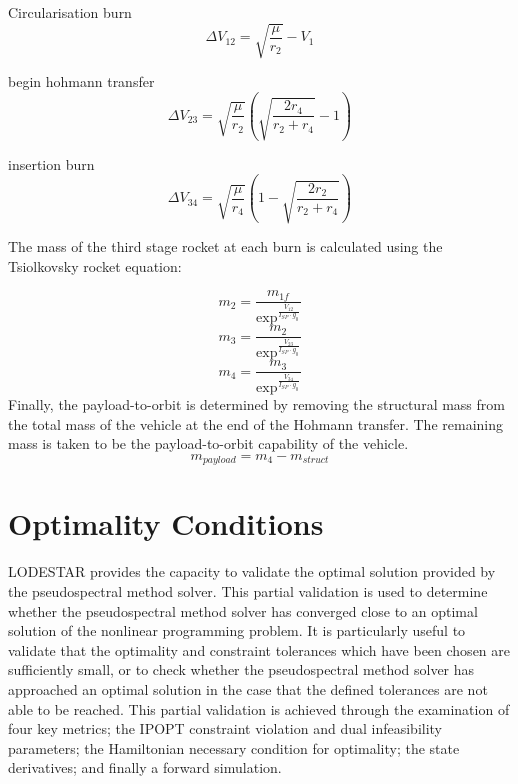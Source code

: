 Circularisation burn
\begin{equation}
\Delta V_{12} = \sqrt{\dfrac{\mu}{r_2}} - V_1
\end{equation}

begin hohmann transfer
\begin{equation}
\Delta V_{23} = \sqrt{\dfrac{\mu}{r_2}} \left( \sqrt{\dfrac{2r_4}{r_2 + r_4}} -1 \right)
\end{equation}

insertion burn
\begin{equation}
\Delta V_{34} = \sqrt{\dfrac{\mu}{r_4}} \left(1- \sqrt{\dfrac{2r_2}{r_2 + r_4}}  \right)
\end{equation}


The mass of the third stage rocket at each burn is calculated using the Tsiolkovsky rocket equation:

\begin{equation}
m_2 = \frac{m_{1f}}{\exp^{\frac{V_{12}}{I_{SP} \cdot g_0}}}
\end{equation}
\begin{equation}
m_3 = \frac{m_{2}}{\exp^{\frac{V_{23}}{I_{SP} \cdot g_0}}}
\end{equation}
\begin{equation}
m_4 = \frac{m_{3}}{\exp^{\frac{V_{34}}{I_{SP} \cdot g_0}}}
\end{equation}
Finally, the payload-to-orbit is determined by removing the structural mass from the total mass of the vehicle at the end of the Hohmann transfer. The remaining mass is taken to be the payload-to-orbit capability of the vehicle.
\begin{equation}
m_{payload} = m_4 - m_{struct}
\end{equation}



\section{Optimality Conditions}

LODESTAR provides the capacity to validate the optimal solution provided by the pseudospectral method solver. This partial validation is used to determine whether the pseudospectral method solver has converged close to an optimal solution of the nonlinear programming problem. It is particularly useful to validate that the optimality and constraint tolerances which have been chosen are sufficiently small, or to check whether the pseudospectral method solver has approached an optimal solution in the case that the defined tolerances are not able to be reached.   
This partial validation is achieved through the examination of four key metrics; the IPOPT constraint violation and dual infeasibility parameters; the Hamiltonian necessary condition for optimality; the state derivatives; and finally a forward simulation. 

